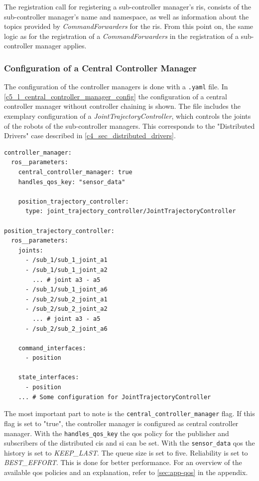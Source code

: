 The registration call for registering a sub-controller manager's \glspl{ri}, consists of the sub-controller manager's name and namespace, as well as information about the topics provided by \textit{CommandForwarders} for the \glspl{ri}. From this point on, the same logic as for the registration of a \textit{CommandForwarders} in the registration of a sub-controller manager applies.

\subsubsection{Configuration of a Central Controller Manager}\label{c5_sec_central_controller_manager_conf}
The configuration of the controller managers is done with a \texttt{.yaml} file. In \autoref{c5_l_central_controller_manager_config} the configuration of a central controller manager without controller chaining is shown. The file includes the exemplary configuration of a \textit{JointTrajectoryController}, which controls the joints of the robots of the sub-controller managers. This corresponds to the "Distributed Drivers" case described in \autoref{c4_sec_distributed_drivers}. 
\lstset{language=yaml,basicstyle=\small}
\begin{lstlisting}[caption=Example configuration of a central controller manager with a joint trajecotry controller.,label=c5_l_central_controller_manager_config]
controller_manager:
  ros__parameters:
    central_controller_manager: true
    handles_qos_key: "sensor_data"
    
    position_trajectory_controller:
      type: joint_trajectory_controller/JointTrajectoryController

position_trajectory_controller:
  ros__parameters:
    joints:
      - /sub_1/sub_1_joint_a1
      - /sub_1/sub_1_joint_a2
        ... # joint a3 - a5
      - /sub_1/sub_1_joint_a6
      - /sub_2/sub_2_joint_a1
      - /sub_2/sub_2_joint_a2
        ... # joint a3 - a5
      - /sub_2/sub_2_joint_a6

    command_interfaces:
      - position

    state_interfaces:
      - position
    ... # Some configuration for JointTrajectoryController 
\end{lstlisting}
The most important part to note is the \lstset{language=yaml,basicstyle=\small\ttfamily, breaklines=true}\lstinline{central_controller_manager} flag. If this flag is set to "true", the controller manager is configured as central controller manager. With the \texttt{handles\_qos\_key} the \gls{qos} policy for the publisher and subscribers of the distributed \glspl{ci} and \gls{si} can be set. With the \lstset{language=yaml,basicstyle=\small\ttfamily, breaklines=true}\lstinline{sensor_data} \gls{qos} the history is set to \textit{KEEP\_LAST}. The queue size is set to five. Reliability is set to \textit{BEST\_EFFORT}. This is done for better performance. For an overview of the available \gls{qos} policies and an explanation, refer to \autoref{sec:app-qos} in the appendix.\newline
